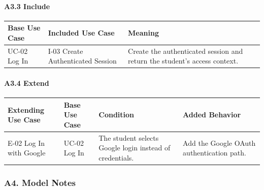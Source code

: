 \documentclass[12pt]{article}
\renewcommand{\baselinestretch}{1.5}
\begin{document}
\paragraph*{A3.3 Include}
\par\medskip

\begingroup
\small
\renewcommand{\baselinestretch}{1.0}\selectfont
\renewcommand{\arraystretch}{1.15}
\setlength{\tabcolsep}{6pt}
\begin{longtable}{|>{\raggedright\arraybackslash}p{}|>{\raggedright\arraybackslash}p{}|>{\raggedright\arraybackslash}p{}|}
\hline
\textbf{Base Use Case} & \textbf{Included Use Case} & \textbf{Meaning} \\ \hline
\endhead
UC-02 Log In & I-03 Create Authenticated Session & Create the authenticated session and return the student's access context. \\ \hline
\end{longtable}
\endgroup
\par\medskip

\hypertarget{sec:a3-4-extend}{}
\paragraph*{A3.4 Extend}
\par\medskip

\begingroup
\small
\renewcommand{\baselinestretch}{1.0}\selectfont
\renewcommand{\arraystretch}{1.15}
\setlength{\tabcolsep}{6pt}
\begin{longtable}{|>{\raggedright\arraybackslash}p{}|>{\raggedright\arraybackslash}p{}|>{\raggedright\arraybackslash}p{}|>{\raggedright\arraybackslash}p{}|}
\hline
\textbf{Extending Use Case} & \textbf{Base Use Case} & \textbf{Condition} & \textbf{Added Behavior} \\ \hline
\endhead
E-02 Log In with Google & UC-02 Log In & The student selects Google login instead of credentials. & Add the Google OAuth authentication path. \\ \hline
\end{longtable}
\endgroup
\par\medskip

\hypertarget{sec:a4-model-notes}{}
\subsubsection*{A4. Model Notes}
\par\medskip
\end{document}
